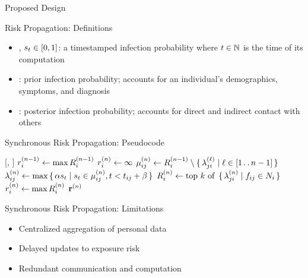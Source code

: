 \documentclass[11pt]{beamer}
\begin{document}
\begin{section}{Proposed Design}

\begin{frame}{Risk Propagation: Definitions}
\begin{itemize}
  \item {}, $s_t \in [0, 1]$: a timestamped infection probability where $t \in \mathbb{N}$ is the time of its computation
  \item {}: prior infection probability; accounts for an individual's demographics, symptoms, and diagnosis \citep{Briers2020, Menni2020}
  \item {}: posterior infection probability; accounts for direct and indirect contact with others
\end{itemize}
\end{frame}

\begin{frame}{Synchronous Risk Propagation: Pseudocode}
\begin{function}{\nRiskPropagation}[\vScores, \vContacts]
  \pause
  \State $r_{i}^{(n - 1)} \leftarrow \max R_{i}^{(n - 1)}$
  \pause
  \State $r_{i}^{(n)} \leftarrow \infty$
  \pause
  \pause
    \State $\mu_{ij}^{(n)} \leftarrow R_{i}^{(n - 1)} \setminus \set{ \lambda_{ji}^{(\ell)} | \ell \in [1 \mathinner{\ldotp \ldotp} n - 1]}$
    \pause
    \State $\lambda_{ij}^{(n)} \leftarrow \max \set{ \alpha s_t| s_t\in \mu_{ij}^{(n)}, t< t_{ij} + \beta}$
    \pause
    \State $\vRiskScores{i}{n} \assign \topK{\setBuilder{\vFactorMessage{j}{i}{n}}{\vFactor[ij] \in \vNeighbors_i}}$
    \pause
    \State $r_{i}^{(n)} \leftarrow \max R_{i}^{(n)}$
    \pause
  \EndWhile
  \State \Return $\mathbf{r}^{(n)}$
\end{function}
\end{frame}

\begin{frame}{Synchronous Risk Propagation: Limitations}
\begin{itemize}
  \item Centralized aggregation of personal data
  \pause
  \item Delayed updates to exposure risk
  \pause
  \item Redundant communication and computation
\end{itemize}
\end{frame}


\end{section}
\end{document}

